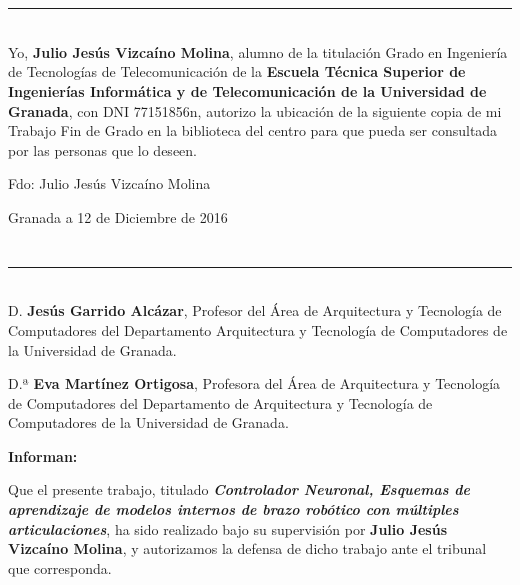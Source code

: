 \chapter*{}
\thispagestyle{empty}

\noindent\rule[-1ex]{\textwidth}{2pt}\\[4.5ex]

Yo, \textbf{Julio Jesús Vizcaíno Molina}, alumno de la titulación Grado en Ingeniería de Tecnologías de Telecomunicación de la \textbf{Escuela Técnica Superior de Ingenierías Informática y de Telecomunicación de la Universidad de Granada}, con DNI 77151856n, autorizo la ubicación de la siguiente copia de mi Trabajo Fin de Grado en la biblioteca del centro para que pueda ser consultada por las personas que lo deseen.

\vspace{6cm}

\noindent Fdo: Julio Jesús Vizcaíno Molina

\vspace{2cm}

\begin{flushright}
Granada a 12 de Diciembre de 2016
\end{flushright}


\chapter*{}
\thispagestyle{empty}

\noindent\rule[-1ex]{\textwidth}{2pt}\\[4.5ex]

D. \textbf{Jesús Garrido Alcázar}, Profesor del Área de Arquitectura y Tecnología de Computadores del Departamento Arquitectura y Tecnología de Computadores de la Universidad de Granada.

\vspace{0.5cm}

D.ª \textbf{Eva Martínez Ortigosa}, Profesora del Área de Arquitectura y Tecnología de Computadores del Departamento de Arquitectura y Tecnología de Computadores de la Universidad de Granada.


\vspace{0.5cm}

\textbf{Informan:}

\vspace{0.5cm}

Que el presente trabajo, titulado \textit{\textbf{Controlador Neuronal, Esquemas de aprendizaje de modelos internos de brazo robótico con múltiples articulaciones}}, ha sido realizado bajo su supervisión por \textbf{Julio Jesús Vizcaíno Molina}, y autorizamos la defensa de dicho trabajo ante el tribunal que corresponda.

